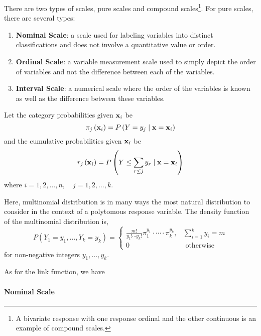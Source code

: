 \begin{remark}
	There are two types of scales, pure scales and compound scales\footnote{A bivariate response with one response ordinal and the other continuous is an example of compound scales.}. For pure scales, there are several types:
	\begin{enumerate}
		\item \textbf{Nominal Scale}: a scale used for labeling variables into distinct classifications and does not involve a quantitative value or order.
		\item \textbf{Ordinal Scale}: a variable measurement scale used to simply depict the order of variables and not the difference between each of the variables.
		\item \textbf{Interval Scale}: a numerical scale where the order of the variables is known as well as the difference between these variables.
	\end{enumerate}
\end{remark}

Let the category probabilities given \(\mathbf{x}_{i}\) be
\begin{equation}
	\pi_{j}\left(\mathbf{x}_{i}\right)=P\left(Y=y_{j}\mid\mathbf{x}=\mathbf{x}_{i}\right)
\end{equation}
and the cumulative probabilities given \(\mathbf{x}_{i}\) be
\begin{equation}
	r_{j}\left(\mathbf{x}_{i}\right)=P\left(Y\leq\sum_{r\leq j}y_{r}\mid\mathbf{x}=\mathbf{x}_{i}\right)
\end{equation}
where \(i=1,2,\ldots,n,\quad j=1,2,\ldots,k\).

Here, multinomial distribution is in many ways the most natural distribution to consider in the context of a polytomous response variable. The density function of the multinomial distribution is,
\begin{equation*}
	P\left(Y_{1}=y_{1},\ldots,Y_{k}=y_{k}\right)=
	\left\{\begin{array}{ll}
		\frac{m!}{y_{1}!\cdots y_{k}!}\pi_{1}^{y_{1}}\cdot\cdots\cdot \pi_{k}^{y_{k}}, & \sum_{i=1}^{k}y_{i}=m \\
		0                                                                              & \text { otherwise }
	\end{array}\right.
\end{equation*}
for non-negative integers \(y_{1},\ldots,y_{k}\).

As for the link function, we have

\paragraph*{Nominal Scale}

